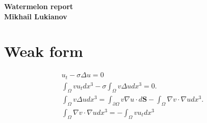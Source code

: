 \documentclass[12pt,english]{article}
\begin{document}
\newcommand{\listOn}{\begin{itemize}\setlength\itemsep{0pt}}
\newcommand{\listOff}{\end{itemize}}

\newcommand{\listNumOn}{\begin{enumerate}\setlength\itemsep{0pt}}
\newcommand{\listNumOff}{\end{enumerate}}

\newcommand{\pic}[5]{
  \begin{figure}[#1]
    \begin{minipage}{0.95\linewidth}
      \centering
      \texttt{[image: \#3]}
      \label{#5}
      \centering
    \end{minipage}
  \end{figure}
}
\begin{center}
    \large
    \bfseries
    Watermelon report\\
    \normalfont
    Mikhail Lukianov \\
\end{center}

\section{Weak form}

$$
\begin{gathered}
u_t-\sigma \Delta u=0 \\
%
\int_{\Omega} v u_t d x^3 -
\sigma \int_{\Omega} v \Delta u d x^3=0 . \\
%
\int_{\Omega} v \Delta u d x^3 =
\int_{\partial \Omega} v \nabla u \cdot d \mathbf{S}
%
- \int_{\Omega} \nabla v \cdot \nabla u d x^3 . \\
\int_{\Omega} \nabla v \cdot \nabla u d x^3 =
- \int_{\Omega} v u_t d x^3
\end{gathered}
$$


% 
% 
\end{document}
